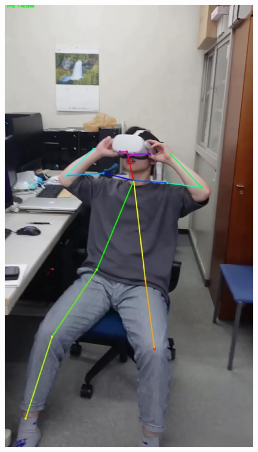 \begin{figure}[h]
    \centering
    \begin{minipage}[h]{0.25\hsize}
      \centering
      \includegraphics[width=0.98\textwidth]{./fig/original.eps}
      \label{fig:original}
    \end{minipage}
    \begin{minipage}[h]{0.25\hsize}
      \centering

\end{minipage}
\end{figure}
